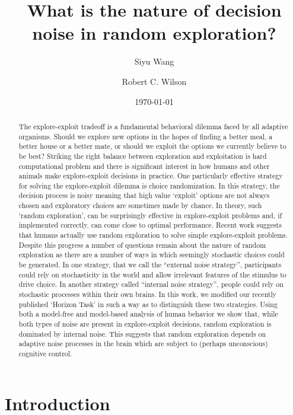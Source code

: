 \documentclass[12pt]{article}
\title{What is the nature of decision noise in random exploration?}
\author[1]{Siyu Wang}
\author[1,2]{Robert C. Wilson}
\affil[1]{Department of Psychology, University of Arizona, Tucson AZ USA}
\affil[2]{Cognitive Science Program, University of Arizona, Tucson AZ USA}
\date{\today}
\begin{document}
	\maketitle
	
	\newpage
	\begin{abstract}
		
		The explore-exploit tradeoff is a fundamental behavioral dilemma faced by all adaptive organisms. Should we explore new options in the hopes of finding a better meal, a better house or a better mate, or should we exploit the options we currently believe to be best? Striking the right balance between exploration and exploitation is hard computational problem and there is significant interest in how humans and other animals make explore-exploit decisions in practice. One particularly effective strategy for solving the explore-exploit dilemma is choice randomization.  In this strategy, the decision process is noisy meaning that high value `exploit' options are not always chosen and exploratory choices are sometimes made by chance. In theory, such `random exploration', can be surprisingly effective in explore-exploit problems and, if implemented correctly, can come close to optimal performance. Recent work suggests that humans actually use random exploration to solve simple explore-exploit problems. Despite this progress a number of questions remain about the nature of random exploration as there are a number of ways in which seemingly stochastic choices could be generated. In one strategy, that we call the “external noise strategy”, participants could rely on stochasticity in the world and allow irrelevant features of the stimulus to drive choice. In another strategy called “internal noise strategy”, people could rely on stochastic processes within their own brains.  In this work, we modified our recently published `Horizon Task' in such a way as to distinguish these two strategies. Using both a model-free and model-based analysis of human behavior we show that, while both types of noise are present in explore-exploit decisions, random exploration is dominated by internal noise. This suggests that random exploration depends on adaptive noise processes in the brain which are subject to (perhaps unconscious) cognitive control. 
	\end{abstract}
	\newpage
	
	
	\section*{Introduction}
	
\end{document}
